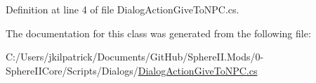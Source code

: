 Definition at line 4 of file Dialog\+Action\+Give\+To\+N\+P\+C.\+cs.



The documentation for this class was generated from the following file\+:\begin{DoxyCompactItemize}
\item 
C\+:/\+Users/jkilpatrick/\+Documents/\+Git\+Hub/\+Sphere\+I\+I.\+Mods/0-\/\+Sphere\+I\+I\+Core/\+Scripts/\+Dialogs/\mbox{\hyperlink{_dialog_action_give_to_n_p_c_8cs}{Dialog\+Action\+Give\+To\+N\+P\+C.\+cs}}\end{DoxyCompactItemize}
